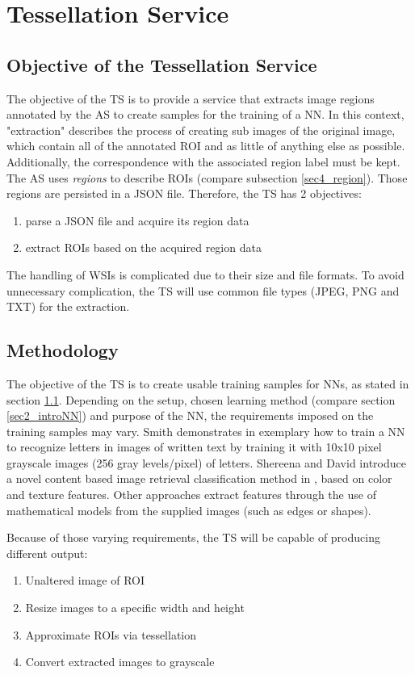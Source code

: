 \chapter{Tessellation Service}
\label{sec5}
\section{Objective of the Tessellation Service}
\label{sec5_objective}
The objective of the TS is to provide a service that extracts image regions annotated by the AS to create samples for the training of a NN. In this context, "extraction" describes the process of creating sub images of the original image, which contain all of the annotated ROI and as little of anything else as possible. Additionally, the correspondence with the associated region label must be kept. The AS uses \emph{regions} to describe ROIs (compare subsection \ref{sec4_region}). Those regions are persisted in a JSON file. Therefore, the TS has 2 objectives:
\begin{enumerate}[(1)]
	\item parse a JSON file and acquire its region data
	\item extract ROIs based on the acquired region data
\end{enumerate}

The handling of WSIs is complicated due to their size and file formats. To avoid unnecessary complication, the TS will use common file types (JPEG, PNG and TXT) for the extraction.


\section{Methodology}
\label{sec5_method}
The objective of the TS is to create usable training samples for NNs, as stated in section \ref{sec5_objective}. Depending on the setup, chosen learning method (compare section \ref{sec2_introNN}) and purpose of the NN, the requirements imposed on the training samples may vary. Smith demonstrates in \cite{Smith97} exemplary how to train a NN to recognize letters in images of written text by training it with 10x10 pixel grayscale images (256 gray levels/pixel) of letters. Shereena and David introduce a novel content based image retrieval classification method in \cite{Shereena14}, based on color and texture features. Other approaches extract features through the use of mathematical models from the supplied images (such as edges or shapes)\cite{Harvey91}.

Because of those varying requirements, the TS will be capable of producing different output:
\begin{enumerate}[(1)]
	\item Unaltered image of ROI
	\item Resize images to a specific width and height
	\item Approximate ROIs via tessellation
	\item Convert extracted images to grayscale
\end{enumerate}

